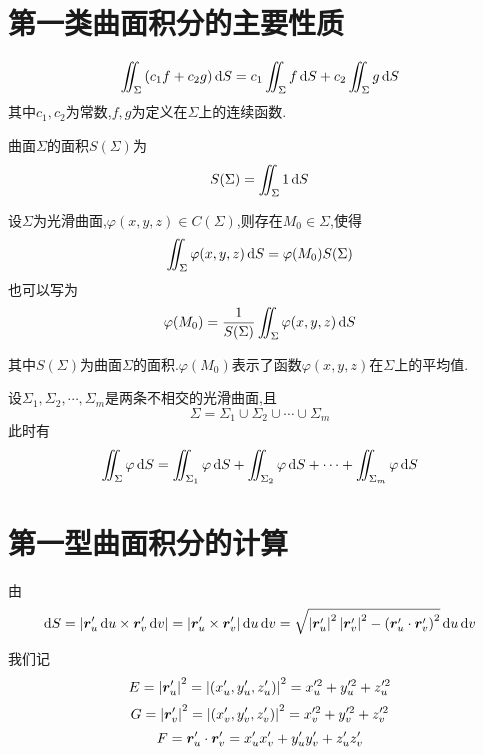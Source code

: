 \section{第一类曲面积分的主要性质}

\begin{proposition}
    [线性性质]

    $$\iint_{\Sigma} \left( c_1 f + c_2 g \right) \operatorname{d\!} S = c_1 \iint_{\Sigma} f \operatorname{d\!} S + c_2 \iint_{\Sigma} g \operatorname{d\!} S$$
    其中$c_1,c_2$为常数,$f,g$为定义在$\Sigma$上的连续函数.
\end{proposition}

\begin{proposition}
    曲面$\Sigma$的面积$S(\Sigma)$为
$$S(\Sigma) = \iint_{\Sigma} 1 \operatorname{d\!} S$$
\end{proposition}

\begin{proposition}
    [积分中值定理]

    设$\Sigma$为光滑曲面,$\varphi(x,y,z) \in C(\Sigma)$,则存在$M_0 \in \Sigma$,使得
$$\iint_{\Sigma} \varphi(x,y,z) \operatorname{d\!} S = \varphi(M_0) S(\Sigma)$$
    也可以写为
$$\varphi(M_0) = \frac{1}{S(\Sigma)} \iint_{\Sigma} \varphi(x,y,z) \operatorname{d\!} S$$

        其中$S(\Sigma)$为曲面$\Sigma$的面积.$\varphi(M_0)$表示了函数$\varphi(x,y,z)$在$\Sigma$上的平均值.
\end{proposition}

\begin{proposition}
    [积分区域可加性]

    设$\Sigma_1,\Sigma_2,\cdots,\Sigma_m$是两条不相交的光滑曲面,且$$\Sigma = \Sigma_1 \cup \Sigma_2 \cup \cdots \cup \Sigma_m$$
    此时有
    $$\iint_{\Sigma} \varphi \operatorname{d\!} S = \iint_{\Sigma_1} \varphi \operatorname{d\!} S + \iint_{\Sigma_2} \varphi \operatorname{d\!} S + \cdots + \iint_{\Sigma_m} \varphi \operatorname{d\!} S$$


\end{proposition}

\section{第一型曲面积分的计算}

由
$$\operatorname{d\!} S = \left|\bm{r}_u' \operatorname{d\!} u \times \bm{r}_v' \operatorname{d\!} v\right| = \left|\bm{r}_u' \times \bm{r}_v'\right| \operatorname{d\!} u \operatorname{d\!} v = \sqrt{\left|\bm{r}_u'\right|^2 \left|\bm{r}_v'\right|^2 - \left( \bm{r}_u' \cdot \bm{r}_v' \right)^2} \operatorname{d\!} u \operatorname{d\!} v$$

我们记
$$E = \left|\bm{r}_u'\right|^2 = \left|(x_u',y_u',z_u')\right|^2 = x_u'^2 + y_u'^2 + z_u'^2$$
$$G = \left|\bm{r}_v'\right|^2 = \left|(x_v',y_v',z_v')\right|^2 = x_v'^2 + y_v'^2 + z_v'^2$$
$$F = \bm{r}_u' \cdot \bm{r}_v' = x_u' x_v' + y_u' y_v' + z_u' z_v'$$

